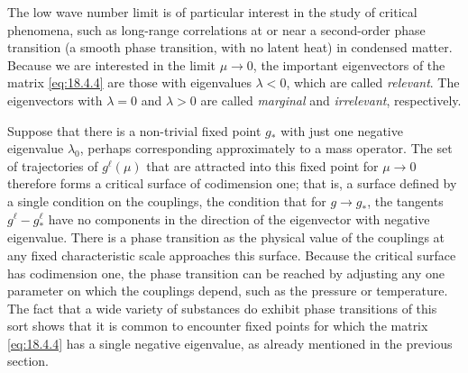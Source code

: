The low wave number limit is of particular interest in the study of critical phenomena, such as long-range correlations at or near a second-order phase transition (a smooth phase transition, with no latent heat) in condensed matter. Because we are interested in the limit $\mu\to0$, the important eigenvectors of the matrix \eqref{eq:18.4.4} are those with eigenvalues $\lambda<0$, which are called \emph{relevant}. The eigenvectors with $\lambda=0$ and $\lambda>0$ are called \emph{marginal} and \emph{irrelevant}, respectively.

Suppose that there is a non-trivial fixed point $g_*$ with just one negative eigenvalue $\lambda_0$, perhaps corresponding approximately to a mass operator. The set of trajectories of $g^\ell(\mu)$ that are attracted into this fixed point for $\mu\to0$ therefore forms a critical surface of codimension one; that is, a surface defined by a single condition on the couplings, the condition that for $g\to g_*$, the tangents $g^\ell-g_*^\ell$ have no components in the direction of the eigenvector with negative eigenvalue. There is a phase transition as the physical value of the couplings at any fixed characteristic scale approaches this surface. Because the critical surface has codimension one, the phase transition can be reached by adjusting any one parameter on which the couplings depend, such as the pressure or temperature. The fact that a wide variety of substances do exhibit phase transitions of this sort shows that it is common to encounter fixed points for which the matrix \eqref{eq:18.4.4} has a single negative eigenvalue, as already mentioned in the previous section.

